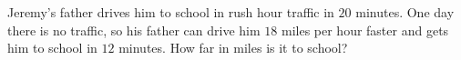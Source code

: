 Jeremy's father drives him to school in rush hour traffic in $20$ minutes. One day there is no traffic, so his father can drive him $18$ miles per hour faster and gets him to school in $12$ minutes. How far in miles is it to school?
